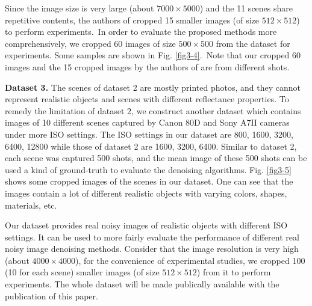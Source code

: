 Since the image size is very large (about $7000\times5000$) and the 11 scenes share repetitive contents, the authors of \cite{crosschannel2016} cropped 15 smaller images (of size $512\times512$) to perform experiments.\ In order to evaluate the proposed methods more comprehensively, we cropped 60 images of size $500\times500$ from the dataset for experiments. Some samples are shown in Fig. \ref{fig3-4}.\ Note that our cropped 60 images and the 15 cropped images by the authors of \cite{crosschannel2016} are from different shots.


\textbf{Dataset 3.} The scenes of dataset 2 are mostly printed photos, and they cannot represent realistic objects and scenes with different reflectance properties. To remedy the limitation of dataset 2, we construct another dataset which contains images of 10 different scenes captured by Canon 80D and Sony A7II cameras under more ISO settings. The ISO settings in our dataset are 800, 1600, 3200, 6400, 12800 while those of dataset 2 are 1600, 3200, 6400. Similar to dataset 2, each scene was captured 500 shots, and the mean image of these 500 shots can be used a kind of ground-truth to evaluate the denoising algorithms. Fig. \ref{fig3-5} shows some cropped images of the scenes in our dataset. One can see that the images contain a lot of different realistic objects with varying colors, shapes, materials, etc. 

Our dataset provides real noisy images of realistic objects with different ISO settings. It can be used to more fairly evaluate the performance of different real noisy image denoising methods. Consider that the image resolution is very high (about $4000\times4000$), for the convenience of experimental studies, we cropped 100 (10 for each scene) smaller images (of size $512\times512$) from it to perform experiments. The whole dataset will be made publically available with the publication of this paper.


